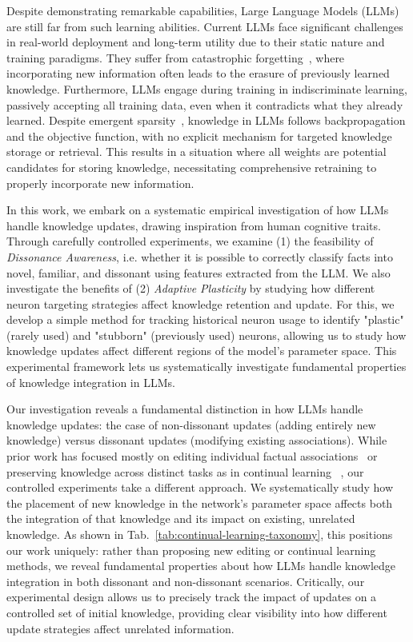 Despite demonstrating remarkable capabilities, Large Language Models (LLMs) are still far from such learning abilities. Current LLMs face significant challenges in real-world deployment and long-term utility due to their static nature and training paradigms. They suffer from catastrophic forgetting~\citep{kirkpatrick2017, kemker2018, li2022Catast, luo2024, kotha2024}, where incorporating new information often leads to the erasure of previously learned knowledge. Furthermore, LLMs engage during training in indiscriminate learning, passively accepting all training data, even when it contradicts what they already learned. Despite emergent sparsity~\citep{jaiswal2023, mirzadeh2024}, knowledge in LLMs follows backpropagation and the objective function, with no explicit mechanism for targeted knowledge storage or retrieval. This results in a situation where all weights are potential candidates for storing knowledge, necessitating comprehensive retraining to properly incorporate new information.

In this work, we embark on a systematic empirical investigation of how LLMs handle knowledge updates, drawing inspiration from human cognitive traits. Through carefully controlled experiments, we examine (1) the feasibility of \textit{Dissonance Awareness}, i.e. whether it is possible to correctly classify facts into novel, familiar, and dissonant using features extracted from the LLM. We also investigate the benefits of (2) \textit{Adaptive Plasticity} by studying how different neuron targeting strategies affect knowledge retention and update. For this, we develop a simple method for tracking historical neuron usage to identify "plastic" (rarely used) and "stubborn" (previously used) neurons, allowing us to study how knowledge updates affect different regions of the model's parameter space. This experimental framework lets us systematically investigate fundamental properties of knowledge integration in LLMs.

Our investigation reveals a fundamental distinction in how LLMs handle knowledge updates: the case of non-dissonant updates (adding entirely new knowledge) versus dissonant updates (modifying existing associations). While prior work has focused mostly on editing individual factual associations~\citep{Meng2022,mitchell2022fast,Meng2022a} or preserving knowledge across distinct tasks as in continual learning ~\citep{rebuffi2017icarl, kirkpatrick2017overcoming, mallya2018packnet}, our controlled experiments take a different approach. We systematically study how the placement of new knowledge in the network's parameter space affects both the integration of that knowledge and its impact on existing, unrelated knowledge. As shown in Tab.~\ref{tab:continual-learning-taxonomy}, this positions our work uniquely: rather than proposing new editing or continual learning methods, we reveal fundamental properties about how LLMs handle knowledge integration in both dissonant and non-dissonant scenarios. Critically, our experimental design allows us to precisely track the impact of updates on a controlled set of initial knowledge, providing clear visibility into how different update strategies affect unrelated information.

